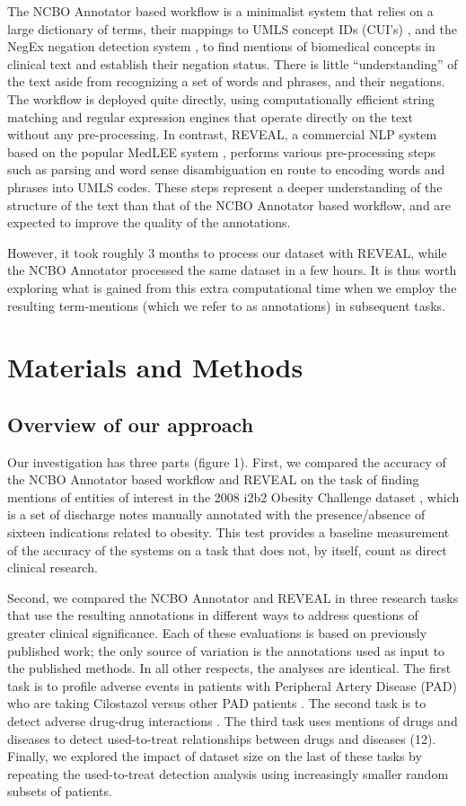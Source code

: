 The NCBO Annotator based workflow is a minimalist system that relies
on a large dictionary of terms, their mappings to UMLS concept IDs
(CUI’s) \cite{Bodenreider2004}, and the NegEx negation detection
system \cite{Chapman2001}, to find mentions of biomedical concepts in
clinical text and establish their negation status.  There is little
“understanding” of the text aside from recognizing a set of words and
phrases, and their negations.  The workflow is deployed quite
directly, using computationally efficient string matching and regular
expression engines \cite{Shah2009,Unitex} that operate directly on the
text without any pre-processing.  In contrast, REVEAL, a commercial
NLP system based on the popular MedLEE system \cite{Friedman2000},
performs various pre-processing steps such as parsing and word sense
disambiguation en route to encoding words and phrases into UMLS codes.
These steps represent a deeper understanding of the structure of the
text than that of the NCBO Annotator based workflow, and are expected
to improve the quality of the annotations.

However, it took roughly 3 months to process our dataset with REVEAL,
while the NCBO Annotator processed the same dataset in a few hours.
It is thus worth exploring what is gained from this extra
computational time when we employ the resulting term-mentions (which
we refer to as annotations) in subsequent tasks.

\section{Materials and Methods}
\subsection{Overview of our approach}
Our investigation has three parts (figure 1).  First, we compared the
accuracy of the NCBO Annotator based workflow and REVEAL on the task
of finding mentions of entities of interest in the 2008 i2b2 Obesity
Challenge dataset \cite{Uzuner2009}, which is a set of discharge notes
manually annotated with the presence/absence of sixteen indications
related to obesity.  This test provides a baseline measurement of the
accuracy of the systems on a task that does not, by itself, count as
direct clinical research.

Second, we compared the NCBO Annotator and REVEAL in three research
tasks that use the resulting annotations in different ways to address
questions of greater clinical significance.  Each of these evaluations
is based on previously published work; the only source of variation is
the annotations used as input to the published methods. In all other
respects, the analyses are identical.  The first task is to profile
adverse events in patients with Peripheral Artery Disease (PAD) who
are taking Cilostazol versus other PAD patients \cite{Leeper2013}.
The second task is to detect adverse drug-drug interactions
\cite{Iyer2014}.  The third task uses mentions of drugs and diseases
to detect used-to-treat relationships between drugs and diseases
\cite{Jung2014}(12).  Finally, we explored the impact of dataset size
on the last of these tasks by repeating the used-to-treat detection
analysis using increasingly smaller random subsets of patients.

